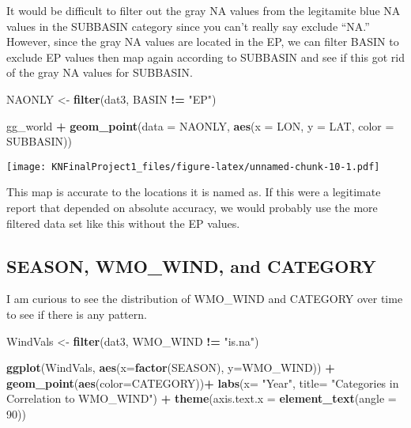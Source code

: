 \documentclass[
]{article}
\newenvironment{Shaded}{\begin{snugshade}}{\end{snugshade}}
\newcommand{\DataTypeTok}[1]{\textcolor[rgb]{0.13,0.29,0.53}{#1}}
\newcommand{\DecValTok}[1]{\textcolor[rgb]{0.00,0.00,0.81}{#1}}
\newcommand{\KeywordTok}[1]{\textcolor[rgb]{0.13,0.29,0.53}{\textbf{#1}}}
\newcommand{\NormalTok}[1]{#1}
\newcommand{\OperatorTok}[1]{\textcolor[rgb]{0.81,0.36,0.00}{\textbf{#1}}}
\newcommand{\StringTok}[1]{\textcolor[rgb]{0.31,0.60,0.02}{#1}}
\begin{document}
It would be difficult to filter out the gray NA values from the
legitamite blue NA values in the SUBBASIN category since you can't
really say exclude ``NA.'' However, since the gray NA values are located
in the EP, we can filter BASIN to exclude EP values then map again
according to SUBBASIN and see if this got rid of the gray NA values for
SUBBASIN.

\begin{Shaded}
\begin{Highlighting}[]
\NormalTok{NAONLY <-}\StringTok{ }\KeywordTok{filter}\NormalTok{(dat3, BASIN }\OperatorTok{!=}\StringTok{ "EP"}\NormalTok{)}

\NormalTok{gg_world }\OperatorTok{+}\StringTok{ }
\StringTok{  }\KeywordTok{geom_point}\NormalTok{(}\DataTypeTok{data =}\NormalTok{ NAONLY, }\KeywordTok{aes}\NormalTok{(}\DataTypeTok{x =}\NormalTok{ LON, }\DataTypeTok{y =}\NormalTok{ LAT, }\DataTypeTok{color =}\NormalTok{ SUBBASIN))}
\end{Highlighting}
\end{Shaded}

\texttt{[image: KNFinalProject1\_files/figure-latex/unnamed-chunk-10-1.pdf]}

This map is accurate to the locations it is named as. If this were a
legitimate report that depended on absolute accuracy, we would probably
use the more filtered data set like this without the EP values.

\hypertarget{season-wmo_wind-and-category}{%
\subsection{SEASON, WMO\_WIND, and
CATEGORY}\label{season-wmo_wind-and-category}}

I am curious to see the distribution of WMO\_WIND and CATEGORY over time
to see if there is any pattern.

\begin{Shaded}
\begin{Highlighting}[]
\NormalTok{WindVals <-}\StringTok{ }\KeywordTok{filter}\NormalTok{(dat3, WMO_WIND }\OperatorTok{!=}\StringTok{ "is.na"}\NormalTok{)}

\KeywordTok{ggplot}\NormalTok{(WindVals, }\KeywordTok{aes}\NormalTok{(}\DataTypeTok{x=}\KeywordTok{factor}\NormalTok{(SEASON), }\DataTypeTok{y=}\NormalTok{WMO_WIND)) }\OperatorTok{+}
\StringTok{  }\KeywordTok{geom_point}\NormalTok{(}\KeywordTok{aes}\NormalTok{(}\DataTypeTok{color=}\NormalTok{CATEGORY))}\OperatorTok{+}\StringTok{ }
\StringTok{  }\KeywordTok{labs}\NormalTok{(}\DataTypeTok{x=} \StringTok{"Year"}\NormalTok{, }\DataTypeTok{title=} \StringTok{"Categories in Correlation to WMO_WIND"}\NormalTok{) }\OperatorTok{+}
\StringTok{  }\KeywordTok{theme}\NormalTok{(}\DataTypeTok{axis.text.x =} \KeywordTok{element_text}\NormalTok{(}\DataTypeTok{angle =} \DecValTok{90}\NormalTok{)) }
\end{Highlighting}
\end{Shaded}
\end{document}
